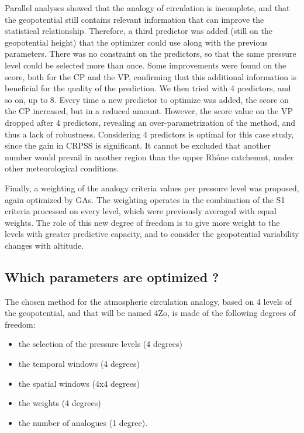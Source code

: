 \documentclass[review]{elsarticle}
\begin{document}
Parallel analyses showed that the analogy of circulation is incomplete, and that the geopotential still contains relevant information that can improve the statistical relationship. Therefore, a third predictor was added (still on the geopotential height) that the optimizer could use along with the previous parameters. There was no constraint on the predictors, so that the same pressure level could be selected more than once. Some improvements were found on the score, both for the CP and the VP, confirming that this additional information is beneficial for the quality of the prediction. We then tried with 4 predictors, and so on, up to 8. Every time a new predictor to optimize was added, the score on the CP increased, but in a reduced amount. However, the score value on the VP dropped after 4 predictors, revealing an over-parametrization of the method, and thus a lack of robustness. Considering 4 predictors is optimal for this case study, since the gain in CRPSS is significant. It cannot be excluded that another number would prevail in another region than the upper Rh\^{o}ne catchemnt, under other meteorological conditions.

Finally, a weighting of the analogy criteria values per pressure level was proposed, again optimized by GAs. The weighting operates in the combination of the S1 criteria processed on every level, which were previously averaged with equal weights. The role of this new degree of freedom is to give more weight to the levels with greater predictive capacity, and to consider the geopotential variability changes with altitude. 


\subsection{Which parameters are optimized ?}

The chosen method for the atmospheric circulation analogy, based on 4 levels of the geopotential, and that will be named 4Zo, is made of the following degrees of freedom:

\begin{itemize}
	\setlength\itemsep{-4px}
	\item the selection of the pressure levels (4 degrees)
	\item the temporal windows (4 degrees)
	\item the spatial windows (4x4 degrees)
	\item the weights (4 degrees)
	\item the number of analogues (1 degree).
\end{itemize}
\end{document}

